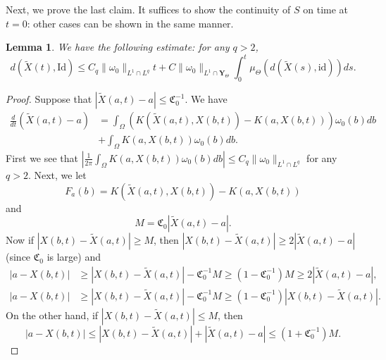 \documentclass[12pt]{article}
\newtheorem{lemma}{Lemma}
\begin{document}
Next, we prove the last claim. It suffices to show the continuity of $S$ on time at $t=0$: other cases can be shown in the same manner. 
\begin{lemma} \label{timeconti}
We have the following estimate: for any $q > 2$,
\begin{equation}
d(\tilde{X}(t), \mathrm{Id } ) \le C_q \| \omega_0 \|_{L^1 \cap L^q} t + C \|\omega_0 \|_{L^1 \cap \mathbf{Y}_{\Theta} } \int_0 ^t  \mu_{\Theta}  ( d (\tilde{X}(s), \mathrm{id} ) ) ds.
\end{equation}
\end{lemma}
\begin{proof}
Suppose that $|\tilde{X}(a,t) - a| \le \mathfrak{C}_0^{-1} $. We have
\begin{equation}
\begin{split}
\frac{d}{dt} \left ( \tilde{X}(a,t) - a \right ) &=  \int_{\Omega} \left ( K(\tilde{X}(a,t), X(b,t) ) - K(a, X(b, t)) \right ) \omega_0 (b ) db  \\
&+ \int_{\Omega} K(a, X(b,t) ) \omega_0 (b) db.
\end{split}
\end{equation}
First we see that $\left | \frac{1}{2\pi} \int_{\Omega} K(a, X(b,t)) \omega_0 (b) db \right | \le C_q \| \omega_0 \|_{L^1 \cap L^q}$ for any $q>2$. Next, we let
\begin{equation}
F_{a} (b) = K(\tilde{X}(a,t), X(b,t) ) - K(a, X(b,t) )
\end{equation}
and 
\begin{equation}
M = \mathfrak{C}_0 |\tilde{X}(a,t) - a|.
\end{equation}
Now if $|X(b,t) - \tilde{X}(a,t) | \ge M$, then $|X(b,t) - \tilde{X}(a,t) | \ge 2 |\tilde{X}(a,t) - a|$ (since $\mathfrak{C}_0$ is large) and
\begin{equation*}
\begin{split}
|a - X(b,t) | &\ge |X(b, t) - \tilde{X}(a,t) | - \mathfrak{C}_0^{-1} M \ge (1-\mathfrak{C}_0^{-1}) M \ge 2 |\tilde{X}(a,t) - a|, \\
|a - X(b,t) | &\ge |X(b, t) - \tilde{X}(a,t) | - \mathfrak{C}_0^{-1} M \ge (1- \mathfrak{C}_0^{-1}) |X(b,t) - \tilde{X}(a,t) |.
\end{split}
\end{equation*}
On the other hand, if $|X(b,t) - \tilde{X}(a,t) | \le M$, then 
\begin{equation}
|a - X(b,t) | \le |X(b, t) - \tilde{X}(a,t ) | + |\tilde{X}(a,t) - a | \le (1+\mathfrak{C}_0^{-1}) M.
\end{equation}

\end{proof}
\end{document}
